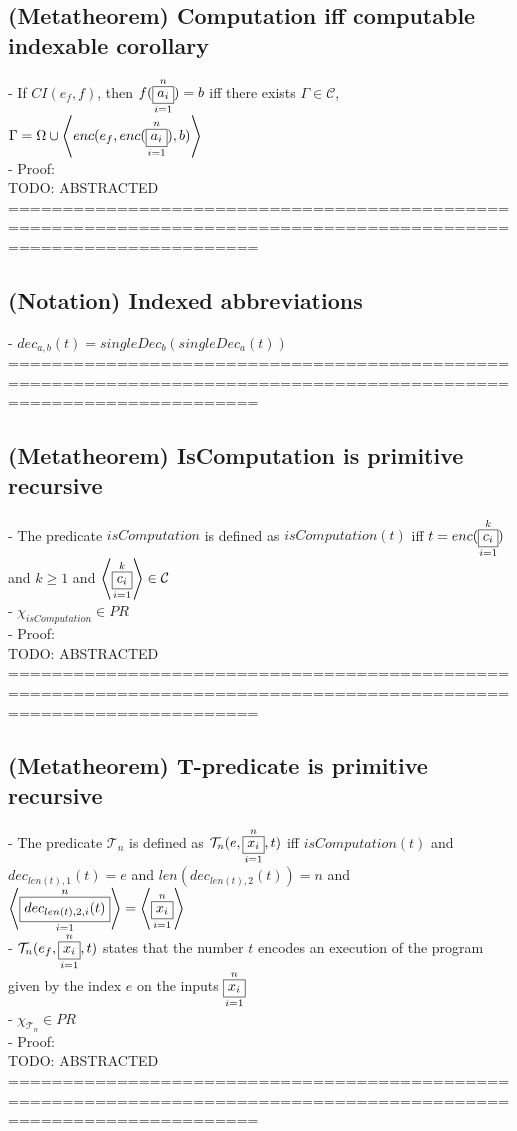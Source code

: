 \documentclass{book}
\newcommand{\seq}[1]{\left\langle #1 \right\rangle}
\newcommand{\vdc}[3]{\underset{#2}{\overset{#3}{\fbox{$#1$}}}}
\begin{document}
\subsection{(Metatheorem) Computation iff computable indexable corollary} %
	- If $CI(e_f, f)$, then $f(\vdc{a_i}{i=1}{n})	= b$ iff there exists $\Gamma \in \mathcal{C}$, $\Gamma = \Omega \cup \seq{enc(e_f, enc(\vdc{a_i}{i=1}{n}), b)}$ \\
	- Proof: \\ TODO: ABSTRACTED
	===================================================================================================================
\subsection{(Notation) Indexed abbreviations} %
	- $dec_{a, b}(t) = singleDec_b(singleDec_a(t))$ \\
	===================================================================================================================
\subsection{(Metatheorem) IsComputation is primitive recursive} %
	- The predicate $isComputation$ is defined as $isComputation(t)$ iff $t = enc(\vdc{c_i}{i=1}{k})$ and $k \geq 1$ and $\seq{\vdc{c_i}{i=1}{k}} \in \mathcal{C}$ \\
	- $\chi_{isComputation} \in PR$ \\
	- Proof: \\ TODO: ABSTRACTED
	===================================================================================================================
\subsection{(Metatheorem) T-predicate is primitive recursive} %
	- The predicate $\mathcal{T}_n$ is defined as $\mathcal{T}_n(e, \vdc{x_i}{i=1}{n}, t)$ iff $isComputation(t)$ and $dec_{len(t), 1}(t) = e$ and $len(dec_{len(t), 2}(t)) = n$ and $\seq{\vdc{dec_{len(t), 2, i}(t)}{i=1}{n}} = \seq{\vdc{x_i}{i=1}{n}}$ \\
	- $\mathcal{T}_n(e_f, \vdc{x_i}{i=1}{n}, t)$ states that the number $t$ encodes an execution of the program given by the index $e$ on the inputs $\vdc{x_i}{i=1}{n}$ \\
	- $\chi_{\mathcal{T}_n} \in PR$ \\
	- Proof: \\ TODO: ABSTRACTED
	===================================================================================================================
\end{document}
